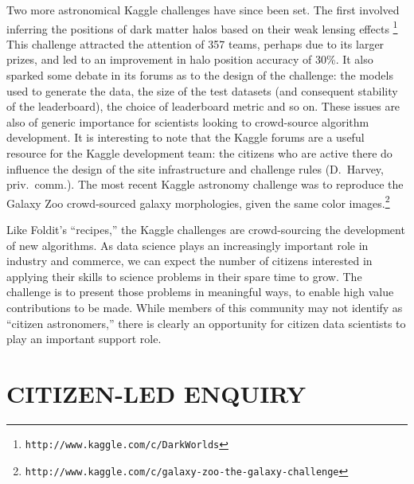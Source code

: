 \documentclass{ar2e}
\def\url#1{\texttt{#1}}
\begin{document}
Two more astronomical Kaggle challenges have since been set. The first
involved inferring the positions of dark matter halos based on their weak
lensing effects
\citep{Harvey++2014}\footnote{\url{http://www.kaggle.com/c/DarkWorlds}}  This
challenge attracted the attention of 357 teams, perhaps due to its larger
prizes, and led to an improvement in halo position accuracy of 30\%.  It also
sparked some debate in its forums as to the design of the challenge: the
models used to generate the data, the size of the test datasets (and
consequent stability of the leaderboard),  the choice of leaderboard metric
and so on. These issues are also of generic importance for scientists looking
to crowd-source algorithm development. It is interesting to note that the
Kaggle forums are a useful resource for the Kaggle development team: the
citizens who are active there do influence the design of the site
infrastructure and challenge rules (D.~Harvey, priv.~comm.). The most recent
Kaggle astronomy challenge was to reproduce the Galaxy Zoo crowd-sourced
galaxy morphologies, given the same color
images.\footnote{\url{http://www.kaggle.com/c/galaxy-zoo-the-galaxy-challenge}}



Like Foldit's ``recipes,'' the Kaggle challenges are crowd-sourcing the
development of new algorithms. As data science plays an increasingly important
role in industry and commerce, we can expect the number of citizens interested
in applying their skills to science problems in their spare time to grow. The
challenge is to present those problems in meaningful ways, to enable high value
contributions to be made. While members of this community may not identify as
``citizen astronomers,'' there is clearly an opportunity for citizen data
scientists to play an important support role.



\section{CITIZEN-LED ENQUIRY}
\label{sec:explore}
\end{document}
